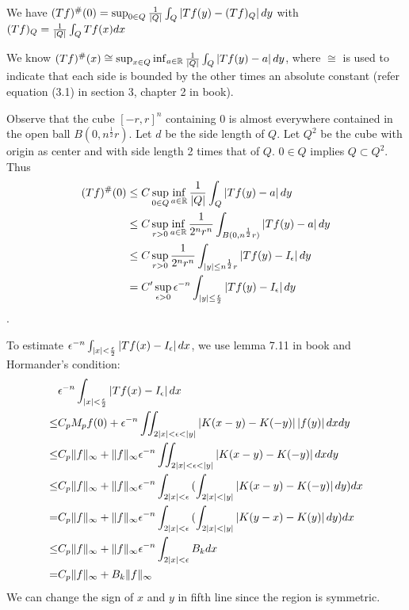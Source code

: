 \begin{remark}[notes on proof of inequality \eqref{ieq: case p=infty}]
    We have $(Tf)^\#(0)=\sup_{0\in Q}\frac{1}{\left\lvert Q\right\rvert}\int_Q{\left\lvert Tf(y)-(Tf)_Q\right\rvert dy}$ with $(Tf)_Q=\frac{1}{\left\lvert Q\right\rvert}\int_Q{Tf(x)dx}$\par
    We know $(T f)^\#(x)\cong\sup_{x\in Q}\inf_{a\in\mathbb{R}}\frac{1}{\left\lvert Q\right\rvert}\int_Q{\left\lvert Tf(y)-a\right\rvert dy}$, where $\cong$ is used to indicate that each side is bounded by the other times an absolute constant (refer equation (3.1) in section 3, chapter 2 in book).\par
    {\color{blue}Observe that the cube $[-r,r]^n$ containing 0 is almost everywhere contained in the open ball $B(0,n^\frac{1}{2}r)$. Let $d$ be the side length of $Q$. Let $Q^2$ be the cube with origin as center and with side length 2 times that of $Q$. $0\in Q$ implies $Q\subset Q^2$. Thus 
    \begin{align*}
        (T f)^\#(0)&\leq C\sup_{0\in Q}\inf_{a\in\mathbb{R}}\frac{1}{\left\lvert Q\right\rvert}\int_Q{\left\lvert Tf(y)-a\right\rvert dy}\\
                    &\leq C\sup_{r>0}\inf_{a\in\mathbb{R}}\frac{1}{2^nr^n}\int_{B(0,n^\frac{1}{2}r)}{\left\lvert Tf(y)-a\right\rvert dy}\\
                    &\leq C\sup_{r>0}\frac{1}{2^nr^n}\int_{\left\lvert y\right\rvert\leq n^\frac{1}{2}r}{\left\lvert Tf(y)-I_\epsilon\right\rvert dy}\\
                    & =C'\sup_{\epsilon>0}\epsilon^{-n}\int_{\left\lvert y\right\rvert\leq \frac{\epsilon}{2}}{\left\lvert Tf(y)-I_\epsilon\right\rvert dy}\\
    \end{align*}
    }.\par
    To estimate $\epsilon^{-n}\int_{\left\lvert x\right\rvert<\frac{\epsilon}{2}}{\left\lvert Tf(x)-I_\epsilon\right\rvert dx}$, we use lemma 7.11 in book and Hormander's condition:
    \begin{align*}
             & \epsilon^{-n}\int_{\left\lvert x\right\rvert<\frac{\epsilon}{2}}{\left\lvert Tf(x)-I_\epsilon\right\rvert dx}                                                  \\
        \leq & C_pM_pf(0)+\epsilon^{-n}\iint_{2\left\lvert x\right\rvert<\epsilon<\left\lvert y\right\rvert}{\left\lvert K(x-y)-K(-y)\right\rvert\left\lvert f(y)\right\rvert dxd y}                              \\
        \leq & C_p\lVert f\rVert_\infty+\lVert f\rVert_\infty\epsilon^{-n}\iint_{2\left\lvert x\right\rvert<\epsilon<\left\lvert y\right\rvert}{\left\lvert K(x-y)-K(-y)\right\rvert dxdy}                  \\
        \leq & C_p\lVert f\rVert_\infty+\lVert f\rVert_\infty\epsilon^{-n}\int_{2\left\lvert x\right\rvert<\epsilon}{(\int_{2\left\lvert x\right\rvert<\left\lvert y\right\rvert}\left\lvert K(x-y)-K(-y)\right\rvert d y)dx} \\
        =    & C_p\lVert f\rVert_\infty+\lVert f\rVert_\infty\epsilon^{-n}\int_{2\left\lvert x\right\rvert<\epsilon}{(\int_{2\left\lvert x\right\rvert<\left\lvert y\right\rvert}\left\lvert K(y-x)-K(y)\right\rvert d y)dx}  \\
        \leq & C_p\lVert f\rVert_\infty+\lVert f\rVert_\infty\epsilon^{-n}\int_{2\left\lvert x\right\rvert<\epsilon}{B_kdx}                                            \\
        =    & C_p\lVert f\rVert_\infty+B_k\lVert f\rVert_\infty
    \end{align*}
    We can change the sign of $x$ and $y$ in fifth line since the region is symmetric.
\end{remark}
